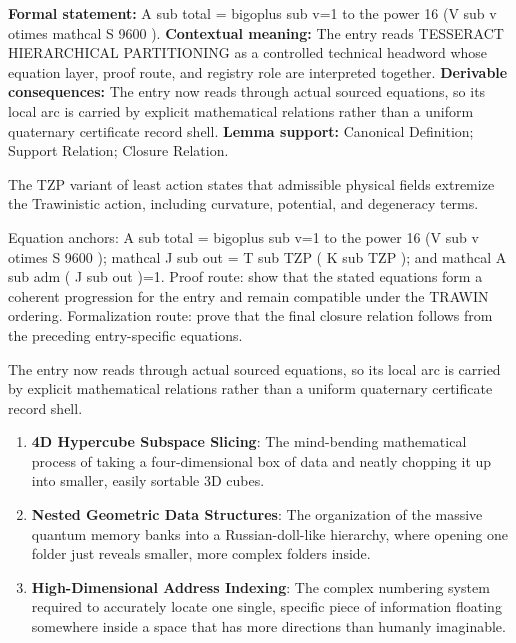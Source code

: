 \begingroup\footnotesize\setlength{\emergencystretch}{3em}\sloppy
\textbf{Formal statement:} A sub total = bigoplus sub v=1 to the power 16 (V sub v otimes mathcal S 9600 ). \textbf{Contextual meaning:} The entry reads TESSERACT HIERARCHICAL PARTITIONING as a controlled technical headword whose equation layer, proof route, and registry role are interpreted together. \textbf{Derivable consequences:} The entry now reads through actual sourced equations, so its local arc is carried by explicit mathematical relations rather than a uniform quaternary certificate record shell. \textbf{Lemma support:} Canonical Definition; Support Relation; Closure Relation.\par
\endgroup

The TZP variant of least action states that admissible physical fields extremize the Trawinistic action, including curvature, potential, and degeneracy terms.

Equation anchors: A sub total = bigoplus sub v=1 to the power 16 (V sub v otimes S 9600 ); mathcal J sub out = T sub TZP ( K sub TZP ); and mathcal A sub adm ( J sub out )=1. Proof route: show that the stated equations form a coherent progression for the entry and remain compatible under the TRAWIN ordering. Formalization route: prove that the final closure relation follows from the preceding entry-specific equations.

The entry now reads through actual sourced equations, so its local arc is carried by explicit mathematical relations rather than a uniform quaternary certificate record shell.
\endgroup

\begin{enumerate}[leftmargin=1.6em,itemsep=6pt,topsep=4pt]
\item \textbf{4D Hypercube Subspace Slicing}: The mind-bending mathematical process of taking a four-dimensional box of data and neatly chopping it up into smaller, easily sortable 3D cubes.
\item \textbf{Nested Geometric Data Structures}: The organization of the massive quantum memory banks into a Russian-doll-like hierarchy, where opening one folder just reveals smaller, more complex folders inside.
\item \textbf{High-Dimensional Address Indexing}: The complex numbering system required to accurately locate one single, specific piece of information floating somewhere inside a space that has more directions than humanly imaginable.
\end{enumerate}

